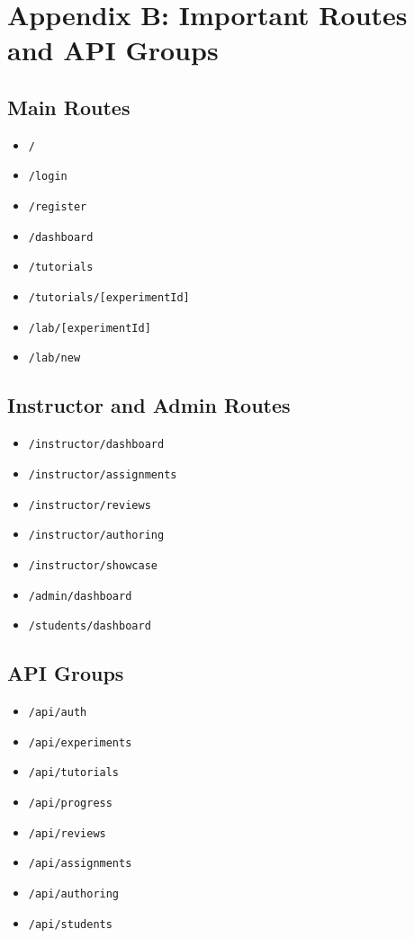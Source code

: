 \documentclass[12pt,a4paper]{report}
\begin{document}
\chapter{Appendix B: Important Routes and API Groups}
\section{Main Routes}
\begin{itemize}
\item \texttt{/}
\item \texttt{/login}
\item \texttt{/register}
\item \texttt{/dashboard}
\item \texttt{/tutorials}
\item \texttt{/tutorials/[experimentId]}
\item \texttt{/lab/[experimentId]}
\item \texttt{/lab/new}
\end{itemize}

\section{Instructor and Admin Routes}
\begin{itemize}
\item \texttt{/instructor/dashboard}
\item \texttt{/instructor/assignments}
\item \texttt{/instructor/reviews}
\item \texttt{/instructor/authoring}
\item \texttt{/instructor/showcase}
\item \texttt{/admin/dashboard}
\item \texttt{/students/dashboard}
\end{itemize}

\section{API Groups}
\begin{itemize}
\item \texttt{/api/auth}
\item \texttt{/api/experiments}
\item \texttt{/api/tutorials}
\item \texttt{/api/progress}
\item \texttt{/api/reviews}
\item \texttt{/api/assignments}
\item \texttt{/api/authoring}
\item \texttt{/api/students}
\end{itemize}
\end{document}
